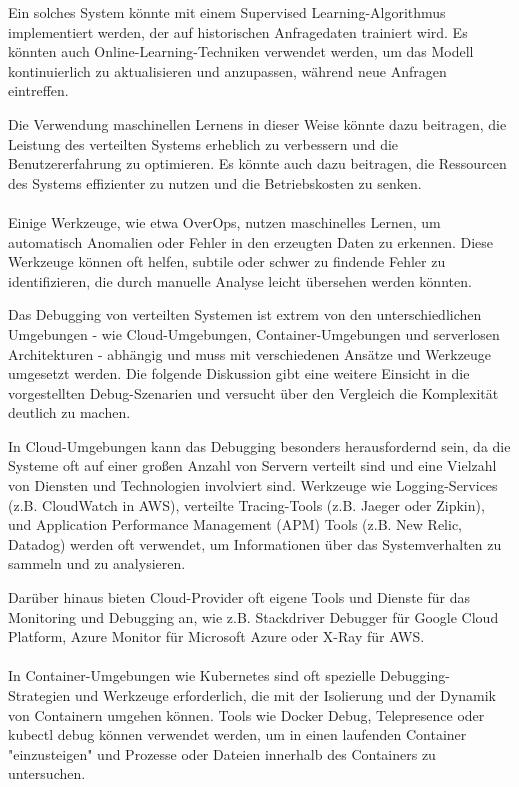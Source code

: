 Ein solches System könnte mit einem Supervised Learning-Algorithmus implementiert werden, der auf historischen Anfragedaten trainiert wird. Es könnten auch Online-Learning-Techniken verwendet werden, um das Modell kontinuierlich zu aktualisieren und anzupassen, während neue Anfragen eintreffen.

Die Verwendung maschinellen Lernens in dieser Weise könnte dazu beitragen, die Leistung des verteilten Systems erheblich zu verbessern und die Benutzererfahrung zu optimieren. Es könnte auch dazu beitragen, die Ressourcen des Systems effizienter zu nutzen und die Betriebskosten zu senken.
\\\\
Einige Werkzeuge, wie etwa OverOps, nutzen maschinelles Lernen, um automatisch Anomalien oder Fehler in den erzeugten Daten zu erkennen. Diese Werkzeuge können oft helfen, subtile oder schwer zu findende Fehler zu identifizieren, die durch manuelle Analyse leicht übersehen werden könnten.

Das Debugging von verteilten Systemen ist extrem von den unterschiedlichen Umgebungen - wie Cloud-Umgebungen, Container-Umgebungen und serverlosen Architekturen - abhängig und muss mit verschiedenen Ansätze und Werkzeuge umgesetzt werden. Die folgende Diskussion gibt eine weitere Einsicht in die vorgestellten Debug-Szenarien und versucht über den Vergleich die Komplexität deutlich zu machen. 

In Cloud-Umgebungen kann das Debugging besonders herausfordernd sein, da die Systeme oft auf einer großen Anzahl von Servern verteilt sind und eine Vielzahl von Diensten und Technologien involviert sind. Werkzeuge wie Logging-Services (z.B. CloudWatch in AWS), verteilte Tracing-Tools (z.B. Jaeger oder Zipkin), und Application Performance Management (APM) Tools (z.B. New Relic, Datadog) werden oft verwendet, um Informationen über das Systemverhalten zu sammeln und zu analysieren.

Darüber hinaus bieten Cloud-Provider oft eigene Tools und Dienste für das Monitoring und Debugging an, wie z.B. Stackdriver Debugger für Google Cloud Platform, Azure Monitor für Microsoft Azure oder X-Ray für AWS.
\\\\
In Container-Umgebungen wie Kubernetes sind oft spezielle Debugging-Strategien und Werkzeuge erforderlich, die mit der Isolierung und der Dynamik von Containern umgehen können. Tools wie Docker Debug, Telepresence oder kubectl debug können verwendet werden, um in einen laufenden Container "einzusteigen" und Prozesse oder Dateien innerhalb des Containers zu untersuchen.


